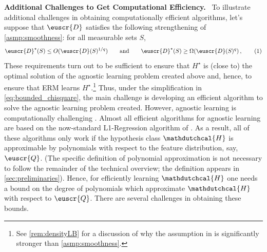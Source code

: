 \documentclass[11pt]{article}
\makeatletter
\theoremstyle{plain}
\theoremstyle{definition}
\theoremstyle{remark}
\newcommand{\yesnum}{\addtocounter{equation}{1}\tag{\theequation}}
\renewcommand{\eqref}[1]{\textup{\eqrefform@{\ref{#1}}}}
\let\eqrefform@\tagform@
\newcommand{\qquadtext}[1]{\qquad\text{#1}\qquad}
\newcommand{\qquadand}{\qquadtext{and}}
\newcommand{\customcal}[1]{\euscr{#1}}
\newcommand{\cD}{\customcal{D}}
\newcommand{\cQ}{\customcal{Q}}
\renewcommand{\paragraph}[1]{\medskip \noindent\textbf{#1}~}
\newcommand{\hypo}[1]{\mathdutchcal{#1}}
\newcommand{\hyH}{\hypo{H}}
\newcommand{\lreg}{\textsf{L1-Regression}}
\newcommand{\optset}{{H^\star}}
\newcommand{\cDtrue}{\cD^\star}
\makeatother
\begin{document}
        \paragraph{Additional Challenges to Get Computational Efficiency.}
        To illustrate additional challenges in obtaining computationally efficient algorithms, let's suppose that $\cD$ satisfies the following strengthening of \cref{asmp:smoothness}: for all measurable sets $S$,
            \[
                \cDtrue(S)
                    \leq O(\cD(S)^{1/q})
                \qquadand
                \cDtrue(S)
                    \geq \Omega(\cD(S)^{q})
                \,,
                \yesnum\label{eq:bounded_chisquare}
            \]
            These requirements turn out to be sufficient to ensure that $\optset$ is (close to) the optimal solution of the agnostic learning problem created above and, hence, to ensure that ERM learns $\optset$.\footnote{See \cref{rem:densityLB} for a discussion of why the assumption in \eqref{eq:bounded_chisquare} is significantly stronger than \cref{asmp:smoothness}.}
            Thus, under the simplification in \cref{eq:bounded_chisquare}, the main challenge is developing an efficient algorithm to solve the agnostic learning problem created.
            However, agnostic learning is computationally challenging  \cite{guruswami2009hardness, feldman2006new, daniely2016complexity}.
            Almost all efficient algorithms for agnostic learning are based on the now-standard \lreg{} algorithm of \citet*{kalai2008agnostically}.
            As a result, all of these algorithms only work if the hypothesis class $\hyH$ is approximable by polynomials with respect to the feature distribution, say, $\cQ$.
            (The specific definition of polynomial approximation is not necessary to follow the remainder of the technical overview; the definition appears in \cref{sec:preliminaries}).
            Hence, for efficiently learning $\hyH$ one needs a bound on the degree of polynomials which approximate $\hyH$ with respect to $\cQ$.
            There are several challenges in obtaining these bounds.
\end{document}
